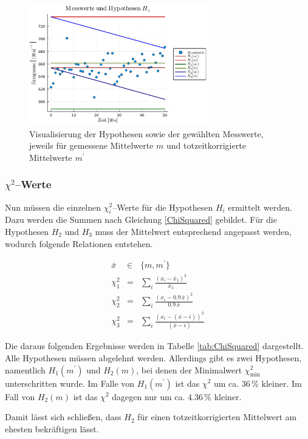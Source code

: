 \documentclass[12pt,a4paper]{scrartcl}
\numberwithin{equation}{section} %
\begin{document}
\begin{figure}[h]
	\centering
	\includegraphics[width=0.7\textwidth]{../media/B3.1/Hypothesen_plot.pdf}
	\caption{Visualisierung der Hypothesen sowie der gewählten Messwerte,\\
		jeweils für gemessene Mittelwerte $m$ und totzeitkorrigierte Mittelwerte $m^\prime$}
	\label{abb:Hypothesen}
\end{figure}

\newpage
\subsubsection{$\chi^2$--Werte}
Nun müssen die einzelnen $\chi^2_i$--Werte für die Hypothesen $H_i$ ermittelt werden. Dazu werden die Summen nach Gleichung \eqref{ChiSquared} gebildet. Für die Hypothesen $H_2$ und $H_3$ muss der Mittelwert entsprechend angepasst werden, wodurch folgende Relationen entstehen.

\begin{eqnarray}
	\bar x &\in& \{m, m^\prime\} \\
	\chi^2_1 &=& \sum_i \frac{(x_i-\bar x_1)^2}{\bar x_1} \\
	\chi^2_2 &=& \sum_i \frac{(x_i-0.9\,\bar x)^2}{0.9\,\bar x} \\
	\chi^2_3 &=& \sum_i \frac{(x_i-(\bar{x} - i))^2}{(\bar{x} - i)}
\end{eqnarray}

\noindent
Die daraus folgenden Ergebnisse werden in Tabelle \ref{tab:ChiSquared} dargestellt. Alle Hypothesen müssen abgelehnt werden. Allerdings gibt es zwei Hypothesen, namentlich $H_1(m^\prime)$ und $H_2(m)$, bei denen der Minimalwert $\chi^2_\mathrm{min}$ unterschritten wurde. Im Falle von $H_1(m^\prime)$ ist das $\chi^2$ um ca. $36\,\%$ kleiner. Im Fall von $H_2(m)$ ist das $\chi^2$ dagegen nur um ca. $4.36\,\%$ kleiner.

Damit lässt sich schließen, dass $H_2$ für einen totzeitkorrigierten Mittelwert am ehesten bekräftigen lässt.
\end{document}
